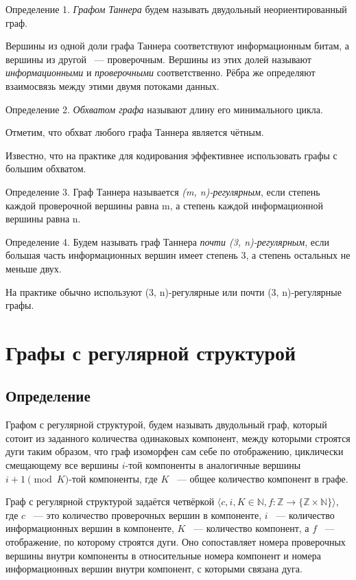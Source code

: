 \documentclass[14pt]{mmcs_article}
\begin{document}
Определение 1. \textsl{Графом Таннера} будем называть двудольный неориентированный граф.

Вершины из одной доли графа Таннера соответствуют информационным битам, а вершины из другой ~--- проверочным. Вершины из этих долей называют \textsl{информационными} и \textsl{проверочными} соответственно. Рёбра же определяют взаимосвязь между этими двумя потоками данных.

Определение 2. \textsl{Обхватом графа} называют длину его минимального цикла.

Отметим, что обхват любого графа Таннера является чётным.

Известно, что на практике для кодирования эффективнее использовать графы с большим обхватом.

Определение 3. Граф Таннера называется \textsl{(m, n)-регулярным}, если степень каждой проверочной вершины равна m, а степень каждой информационной вершины равна n.

Определение 4. Будем называть граф Таннера \textsl{почти (3, n)-регулярным}, если большая часть информационных вершин имеет степень 3, а степень остальных не меньше двух.

На практике обычно используют (3, n)-регулярные или почти (3, n)-регулярные графы.

\newpage
\section{Графы с регулярной структурой}

\subsection{Определение}

Графом с регулярной структурой, будем называть двудольный граф, который сотоит из заданного количества одинаковых компонент, между которыми строятся дуги таким образом, что граф изоморфен сам себе по отображению, циклически смещающему все вершины $i$-той компоненты в аналогичные вершины $i + 1 \pmod K$-той компоненты, где $K$ ~--- общее количество компонент в графе.

Граф с регулярной структурой задаётся четвёркой $\langle c, i, K \in \mathbb{N}, f: \mathbb{Z} \rightarrow \{ \mathbb{Z} \times \mathbb{N} \} \rangle$, где $c$ ~--- это количество проверочных вершин в компоненте, $i$ ~--- количество информационных вершин в компоненте, $K$ ~--- количество компонент, а $f$ ~--- отображение, по которому строятся дуги. Оно сопоставляет номера проверочных вершины внутри компоненты в относительные номера компонент и номера информационных вершин внутри компонент, с которыми связана дуга.
\end{document}
